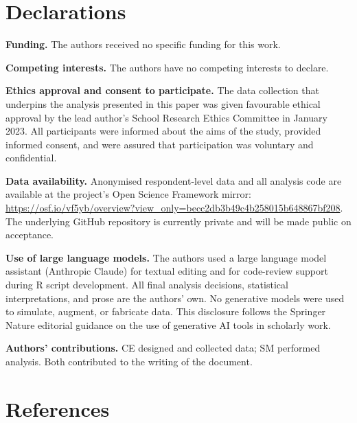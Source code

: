 \documentclass[
  12pt,
  letterpaper,
  DIV=11,
  numbers=noendperiod]{scrartcl}
\begin{document}
\section{Declarations}\label{sec-declarations}

\textbf{Funding.} The authors received no specific funding for this
work.

\textbf{Competing interests.} The authors have no competing interests to
declare.

\textbf{Ethics approval and consent to participate.} The data collection
that underpins the analysis presented in this paper was given favourable
ethical approval by the lead author's School Research Ethics Committee
in January 2023. All participants were informed about the aims of the
study, provided informed consent, and were assured that participation
was voluntary and confidential.

\textbf{Data availability.} Anonymised respondent-level data and all
analysis code are available at the project's Open Science Framework
mirror:
\url{https://osf.io/vf5yb/overview?view_only=becc2db3b49c4b258015b648867bf208}.
The underlying GitHub repository is currently private and will be made
public on acceptance.

\textbf{Use of large language models.} The authors used a large language
model assistant (Anthropic Claude) for textual editing and for
code-review support during R script development. All final analysis
decisions, statistical interpretations, and prose are the authors' own.
No generative models were used to simulate, augment, or fabricate data.
This disclosure follows the Springer Nature editorial guidance on the
use of generative AI tools in scholarly work.

\textbf{Authors' contributions.} CE designed and collected data; SM
performed analysis. Both contributed to the writing of the document.

\newpage

\section*{References}\label{references}

\printbibliography[heading=none]
\end{document}
